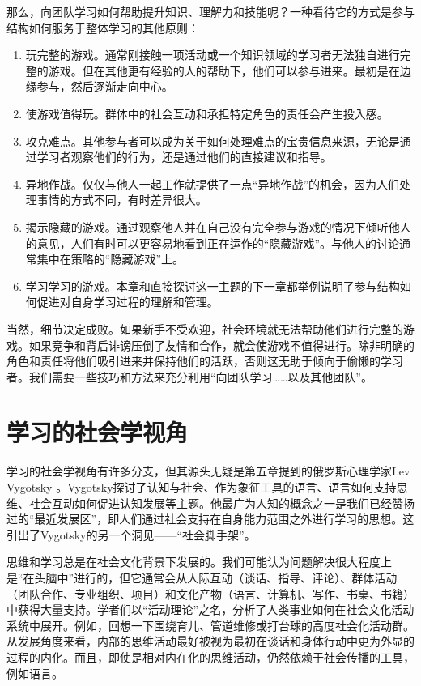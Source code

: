 那么，向团队学习如何帮助提升知识、理解力和技能呢？一种看待它的方式是参与结构如何服务于整体学习的其他原则：
\begin{enumerate}
    \item 玩完整的游戏。通常刚接触一项活动或一个知识领域的学习者无法独自进行完整的游戏。但在其他更有经验的人的帮助下，他们可以参与进来。最初是在边缘参与，然后逐渐走向中心。
    \item 使游戏值得玩。群体中的社会互动和承担特定角色的责任会产生投入感。
    \item 攻克难点。其他参与者可以成为关于如何处理难点的宝贵信息来源，无论是通过学习者观察他们的行为，还是通过他们的直接建议和指导。
    \item 异地作战。仅仅与他人一起工作就提供了一点“异地作战”的机会，因为人们处理事情的方式不同，有时差异很大。
    \item 揭示隐藏的游戏。通过观察他人并在自己没有完全参与游戏的情况下倾听他人的意见，人们有时可以更容易地看到正在运作的“隐藏游戏”。与他人的讨论通常集中在策略的“隐藏游戏”上。
    \item 学习学习的游戏。本章和直接探讨这一主题的下一章都举例说明了参与结构如何促进对自身学习过程的理解和管理。
\end{enumerate}

当然，细节决定成败。如果新手不受欢迎，社会环境就无法帮助他们进行完整的游戏。如果竞争和背后诽谤压倒了友情和合作，就会使游戏不值得进行。除非明确的角色和责任将他们吸引进来并保持他们的活跃，否则这无助于倾向于偷懒的学习者。我们需要一些技巧和方法来充分利用“向团队学习……以及其他团队”。

\section*{学习的社会学视角}

学习的社会学视角有许多分支，但其源头无疑是第五章提到的俄罗斯心理学家Lev Vygotsky 。Vygotsky探讨了认知与社会、作为象征工具的语言、语言如何支持思维、社会互动如何促进认知发展等主题。他最广为人知的概念之一是我们已经赞扬过的“最近发展区”，即人们通过社会支持在自身能力范围之外进行学习的思想。这引出了Vygotsky的另一个洞见——“社会脚手架”。

思维和学习总是在社会文化背景下发展的。我们可能认为问题解决很大程度上是“在头脑中”进行的，但它通常会从人际互动（谈话、指导、评论）、群体活动（团队合作、专业组织、项目）和文化产物（语言、计算机、写作、书桌、书籍）中获得大量支持。学者们以“活动理论”之名，分析了人类事业如何在社会文化活动系统中展开。例如，回想一下围绕育儿、管道维修或打台球的高度社会化活动群。从发展角度来看，内部的思维活动最好被视为最初在谈话和身体行动中更为外显的过程的内化。而且，即使是相对内在化的思维活动，仍然依赖于社会传播的工具，例如语言。

